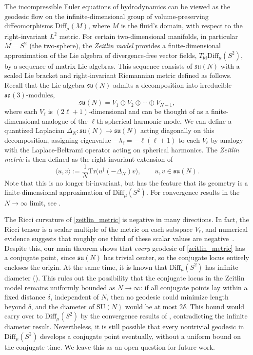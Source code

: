 \documentclass[oneside, 11pt]{amsart}
\numberwithin{equation}{section}
\begin{document}
The incompressible Euler equations of hydrodynamics can be viewed as the geodesic flow on the infinite-dimensional group of volume-preserving diffeomorphisms $\mathrm{Diff}_{\mu}(M)$, where $M$ is the fluid's domain, with respect to the right-invariant $L^2$ metric. For certain two-dimensional manifolds, in particular $M = S^2$ (the two-sphere), the \emph{Zeitlin model} provides a finite-dimensional approximation of the Lie algebra of divergence-free vector fields,  $T_{\mathrm{id}}\mathrm{Diff}_{\mu}(S^2)$, by a sequence of matrix Lie algebras. This sequence consists of $\mathfrak{su}(N)$ with a scaled Lie bracket and right-invariant Riemannian metric defined as follows. Recall that the Lie algebra $\mathfrak{su}(N)$ admits a decomposition into irreducible $\mathfrak{so}(3)$-modules,
\[
\mathfrak{su}(N) = V_1 \oplus V_2 \oplus \cdots \oplus V_{N-1},
\]
where each $V_\ell$ is $(2\ell + 1)$-dimensional and can be thought of as a finite-dimensional analogue of the $\ell$th spherical harmonic mode. We can define a quantized Laplacian $\Delta_N : \mathfrak{su}(N) \rightarrow \mathfrak{su}(N)$ acting diagonally on this decomposition, assigning eigenvalue $-\lambda_\ell = -\ell(\ell+1)$ to each $V_\ell$ by analogy with the Laplace-Beltrami operator acting on spherical harmonics. The \emph{Zeitlin metric} is then defined as the right-invariant extension of
\begin{equation}\label{zeitlin_metric}
 \langle u, v \rangle := \frac{1}{N}\mathrm{Tr}\big(u^{\dagger}(-\Delta_N)v\big), \qquad u, v \in \mathfrak{su}(N).
\end{equation}
Note that this is no longer bi-invariant, but has the feature that its geometry is a finite-dimensional approximation of $\mathrm{Diff}_{\mu}(S^2)$. For convergence results in the $N \rightarrow \infty$ limit, see \cite{ModinViviani}. 


The Ricci curvature of \eqref{zeitlin_metric} is negative in many directions. In fact, the Ricci tensor is a scalar multiple of the metric on each subspace $V_\ell$, and numerical evidence suggests that roughly one third of these scalar values are negative~\cite{klasleandrosteve}. Despite this, our main theorem shows that \emph{every} geodesic of \eqref{zeitlin_metric} has a conjugate point, since $\mathfrak{su}(N)$ has trivial center, so the conjugate locus entirely encloses the origin. At the same time, it is known that $\mathrm{Diff}_{\mu}(S^2)$ has infinite diameter (\cite{Eliashberg}). This rules out the possibility that the conjugate locus in the Zeitlin model remains uniformly bounded as $N \to \infty$: if all conjugate points lay within a fixed distance $\delta$, independent of $N$, then no geodesic could minimize length beyond $\delta$, and the diameter of $\mathrm{SU}(N)$ would be at most $2\delta$. This bound would carry over to $\mathrm{Diff}_{\mu}(S^2)$ by the convergence results of \cite{ModinViviani}, contradicting the infinite diameter result. Nevertheless, it is still possible that every nontrivial geodesic in $\mathrm{Diff}_{\mu}(S^2)$ develops a conjugate point eventually, without a uniform bound on the conjugate time. We leave this as an open question for future work. 
\end{document}
